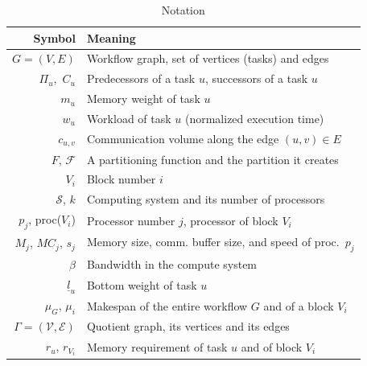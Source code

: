 \documentclass[conference]{IEEEtran}
\newcommand{\bottomlevel}[1]{\underline{l}_{#1}} %
\newcommand{\parents}[1]{\,\Pi_{#1}}
\newcommand{\children}[1]{\,C_{#1}}
\newcommand{\cluster}{\,\mathcal{S}}
\begin{document}
    \begin{table}
        \begin{center}
            \begin{tabular}{rl}
                \hline
                \textbf{Symbol}                       & \textbf{Meaning}                                         \\
                \hline
                $G = (V, E)$                          & Workflow graph, set of vertices (tasks) and edges        \\
                $\parents{u}$, $\children{u}$         & Predecessors of a task $u$, successors of a task $u$            \\
                $m_u$                                 & Memory weight of task $u$                                \\
                $w_u$                                 & Workload of task $u$  (normalized execution time)          \\
                $c_{u,v}$                             & Communication volume along the edge $(u,v)\in E$         \\
                $F$, $\mathcal{F}$                    & A partitioning function and the partition it creates     \\
                $V_i$                                 & Block number $i$                                         \\ %
                $\cluster$, $k$                    & Computing system and its number of processors           \\
                $p_j$, proc($V_i$)                          & Processor number $j$, processor of block $V_i$                 \\
                $M_j$, $MC_j$, $s_j$                               & Memory size, comm. buffer size, and speed of proc.\ $p_j$                          \\
                $\beta$                     & Bandwidth in the compute system                                \\
                $\bottomlevel{u}$                      & Bottom weight of task $u$ \\
                $\mu_G$, $\mu_i$ & Makespan of the entire workflow $G$ and of a block $V_i$               \\
                $\Gamma = (\mathcal{V}, \mathcal{E})$                      & Quotient graph, its vertices and its edges        \\
                $r_u$, $r_{V_i}$                            & Memory requirement of task $u$ and of block $V_i$                 \\
                \hline
            \end{tabular}
        \end{center}
        \caption{Notation} \label{tabnotation}
    \end{table}
\end{document}
